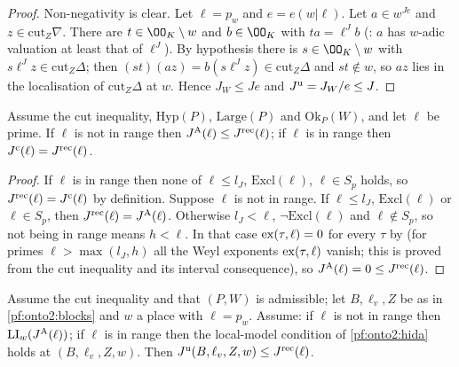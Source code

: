 \begin{proof}
Non-negativity is clear. Let $\ell=p_w$ and $e=e(w|\ell)$. Let $a\in w^{Je}$ and $z\in\mathrm{cut}_Z\nabla$. There are $t\in\OO_K\setminus w$
and $b\in\OO_K$ with $ta=\ell^Jb$ (: $a$ has $w$-adic valuation at least that of
$\ell^J$). By hypothesis there is $s\in\OO_K\setminus w$ with $s\ell^Jz\in\mathrm{cut}_Z\Delta$; then $(st)(az)=b(s\ell^Jz)\in\mathrm{cut}_Z\Delta$
and $st\notin w$, so $az$ lies in the localisation of $\mathrm{cut}_Z\Delta$ at $w$. Hence $J_W\le Je$ and $J^{\mathrm{u}}=J_W/e\le J$.
\end{proof}

\begin{lemma}\label{pf:onto2:recform}
Assume the cut inequality, $\mathrm{Hyp}(P)$, $\mathrm{Large}(P)$ and $\mathrm{Ok}_P(W)$, and let $\ell$ be prime. If $\ell$ is not in range
then $J^{\mathrm{A}}(\ell)\le J^{\mathrm{rec}}(\ell)$; if $\ell$ is in range then $J^{\mathrm c}(\ell)=J^{\mathrm{rec}}(\ell)$.
\end{lemma}

\begin{proof}
If $\ell$ is in range then none of $\ell\le l_J$, $\mathrm{Excl}(\ell)$, $\ell\in S_p$ holds, so $J^{\mathrm{rec}}(\ell)=J^{\mathrm c}(\ell)$ by
definition. Suppose $\ell$ is not in range. If $\ell\le l_J$, $\mathrm{Excl}(\ell)$ or $\ell\in S_p$, then $J^{\mathrm{rec}}(\ell)=J^{\mathrm{A}}(\ell)$.
Otherwise $l_J<\ell$, $\neg\mathrm{Excl}(\ell)$ and $\ell\notin S_p$, so not being in range means $h<\ell$. In that case
$\operatorname{ex}(\tau,\ell)=0$ for every $\tau$ by  (for primes
$\ell>\max(l_J,h)$ all the Weyl exponents $\operatorname{ex}(\tau,\ell)$ vanish; this is proved from the cut inequality and its interval
consequence), so $J^{\mathrm{A}}(\ell)=0\le J^{\mathrm{rec}}(\ell)$.
\end{proof}

\begin{lemma}\label{pf:onto2:jrec}
Assume the cut inequality and that $(P,W)$ is admissible; let $B,\ell_v,Z$ be as in \cref{pf:onto2:blocks} and $w$ a place with
$\ell=p_w$. Assume: if $\ell$ is not in range then $\mathrm{LI}_w(J^{\mathrm{A}}(\ell))$; if $\ell$ is in range then the local-model condition
of \cref{pf:onto2:hida} holds at $(B,\ell_v,Z,w)$. Then $J^{\mathrm{u}}(B,\ell_v,Z,w)\le J^{\mathrm{rec}}(\ell)$.
\end{lemma}

